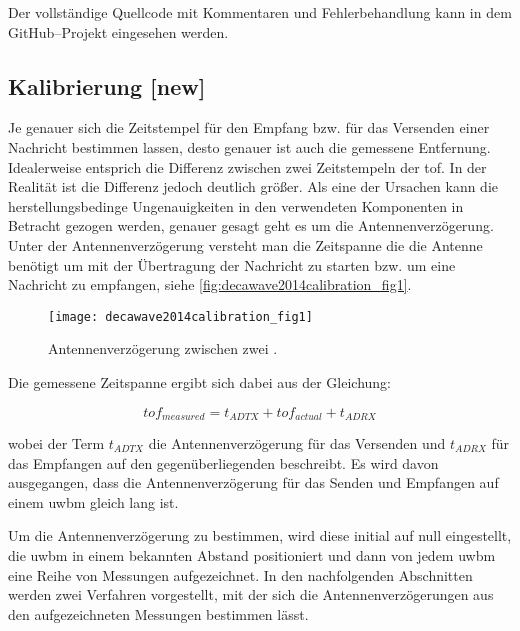 Der vollständige Quellcode mit Kommentaren und Fehlerbehandlung kann in dem GitHub--Projekt \cite{kasdorf2017roslamwithuwb} eingesehen werden.


\begin{comment}
--------------------------------------------------------------------------------
\end{comment}
\subsection{Kalibrierung [new]}

Je genauer sich die Zeitstempel für den Empfang bzw. für das Versenden einer Nachricht bestimmen lassen, desto genauer ist auch die gemessene Entfernung. Idealerweise entsprich die Differenz zwischen zwei Zeitstempeln der \Gls{tof}. In der Realität ist die Differenz jedoch deutlich größer. Als eine der Ursachen kann die herstellungsbedinge Ungenauigkeiten in den verwendeten Komponenten in Betracht gezogen werden, genauer gesagt geht es um die Antennenverzögerung. Unter der Antennenverzögerung versteht man die Zeitspanne die die Antenne benötigt um mit der Übertragung der Nachricht zu starten bzw. um eine Nachricht zu empfangen, siehe  \autoref{fig:decawave2014calibration_fig1}.

\begin{figure}[h]
	\centering
	\texttt{[image: decawave2014calibration\_fig1]}
	\caption{Antennenverzögerung zwischen zwei .}
	\label{fig:decawave2014calibration_fig1}
\end{figure}

Die gemessene Zeitspanne ergibt sich dabei aus der Gleichung: 

\begin{equation}
tof_{measured}=t_{ADTX}+tof_{actual}+t_{ADRX}\label{eq:antenna_delay_1}
\end{equation}

wobei der Term $t_{ADTX}$ die Antennenverzögerung für das Versenden und $t_{ADRX}$ für das Empfangen auf den gegenüberliegenden  beschreibt. Es wird davon ausgegangen, dass die Antennenverzögerung für das Senden und Empfangen auf einem \Gls{uwbm} gleich lang ist. \cite{decawave2016dw1kusermanual}

Um die Antennenverzögerung zu bestimmen, wird diese initial auf null eingestellt, die \Gls{uwbm} in einem bekannten Abstand positioniert und dann von jedem \Gls{uwbm} eine Reihe von Messungen aufgezeichnet. In den nachfolgenden Abschnitten werden zwei Verfahren vorgestellt, mit der sich die Antennenverzögerungen aus den aufgezeichneten Messungen bestimmen lässt.


